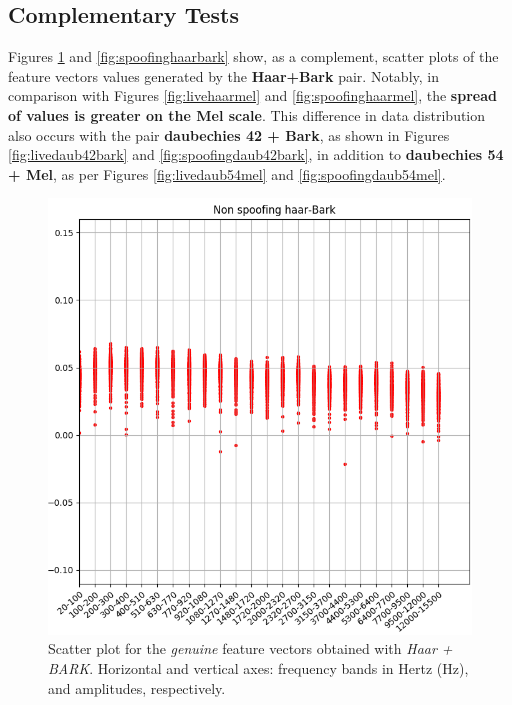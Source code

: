 	\subsection{Complementary Tests}
		\par Figures \ref{fig:livehaarbark} and \ref{fig:spoofinghaarbark} show, as a complement, scatter plots of the feature vectors values generated by the \textbf{Haar+Bark} pair. Notably, in comparison with Figures \ref{fig:livehaarmel} and \ref{fig:spoofinghaarmel}, the \textbf{spread of values is greater on the Mel scale}. This difference in data distribution also occurs with the pair \textbf{daubechies 42 + Bark}, as shown in Figures \ref{fig:livedaub42bark} and \ref{fig:spoofingdaub42bark}, in addition to \textbf{daubechies 54 + Mel}, as per Figures \ref{fig:livedaub54mel} and \ref{fig:spoofingdaub54mel}. 
		\begin{figure}
			\centering
			\includegraphics[scale=.53]{images/results/barkVersusMel/liveHaarBark}
			\caption{Scatter plot for the \textit{genuine} feature vectors obtained with \textit{Haar + BARK}. Horizontal and vertical axes: frequency bands in Hertz (Hz), and amplitudes, respectively.}
			\label{fig:livehaarbark}
		\end{figure}
